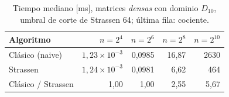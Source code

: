 %
\begin{table}[H]
\centering
\small
\caption{Tiempo mediano [ms], matrices \emph{densas} con dominio $D_{10}$, umbral de corte de Strassen 64; última fila: cociente.}
\label{tab:matrix-time}
\begin{tabular}{lrrrr}
\hline\hline
Algoritmo & $n=2^{4}$ & $n=2^{6}$ & $n=2^{8}$ & $n=2^{10}$ \\
\hline
Clásico (naive) & $1{,}23\times 10^{-3}$ & 0{,}0985 & 16{,}87 & 2630 \\
Strassen & $1{,}24\times 10^{-3}$ & 0{,}0981 & 6{,}62 & 464 \\
\hline
Clásico / Strassen & 1{,}00 & 1{,}00 & 2{,}55 & 5{,}67 \\
\hline\hline
\end{tabular}
\end{table}
